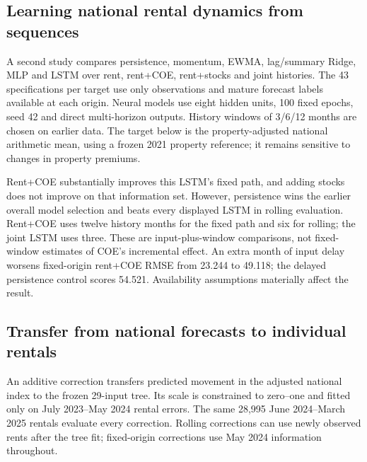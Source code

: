 \documentclass[conference]{IEEEtran}
\begin{document}
\subsection{Learning national rental dynamics from sequences}
A second study compares persistence, momentum, EWMA, lag/summary Ridge, MLP and LSTM over rent, rent+COE, rent+stocks and joint histories. The 43 specifications per target use only observations and mature forecast labels available at each origin. Neural models use eight hidden units, 100 fixed epochs, seed 42 and direct multi-horizon outputs. History windows of 3/6/12 months are chosen on earlier data. The target below is the property-adjusted national arithmetic mean, using a frozen 2021 property reference; it remains sensitive to changes in property premiums.

\begin{table}[!ht]
\caption{Property-adjusted national-mean RMSE (SGD), June 2024--March 2025. Fixed-origin forecasts all ten months using May 2024 information. Rolling pools 1/3/6-month forecasts, averaging squared errors within each target month before averaging months. Each LSTM input set uses its own earlier-selected window.}
\label{tab:auxsequences}
\centering\small

\end{table}

Rent+COE substantially improves this LSTM's fixed path, and adding stocks does not improve on that information set. However, persistence wins the earlier overall model selection and beats every displayed LSTM in rolling evaluation. Rent+COE uses twelve history months for the fixed path and six for rolling; the joint LSTM uses three. These are input-plus-window comparisons, not fixed-window estimates of COE's incremental effect. An extra month of input delay worsens fixed-origin rent+COE RMSE from 23.244 to 49.118; the delayed persistence control scores 54.521. Availability assumptions materially affect the result.

\clearpage
\subsection{Transfer from national forecasts to individual rentals}
An additive correction transfers predicted movement in the adjusted national index to the frozen 29-input tree. Its scale is constrained to zero--one and fitted only on July 2023--May 2024 rental errors. The same 28,995 June 2024--March 2025 rentals evaluate every correction. Rolling corrections can use newly observed rents after the tree fit; fixed-origin corrections use May 2024 information throughout.
\end{document}
